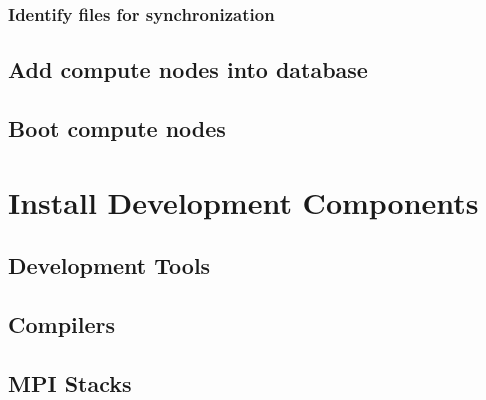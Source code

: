 \documentclass[letterpaper]{article}
\begin{document}
\subsubsection{Identify files for synchronization} \label{sec:file_import}




\subsection{Add compute nodes into \xCAT{} database} \label{sec:xcat_add_nodes}



\subsection{Boot compute nodes} \label{sec:boot_computes}
 

\section{Install \OHPC{} Development Components}


\vspace*{-0.15cm}
\subsection{Development Tools} \label{sec:install_dev_tools}


\vspace*{-0.15cm}
\subsection{Compilers} \label{sec:install_compilers}


\subsection{MPI Stacks} \label{sec:mpi}

\end{document}
